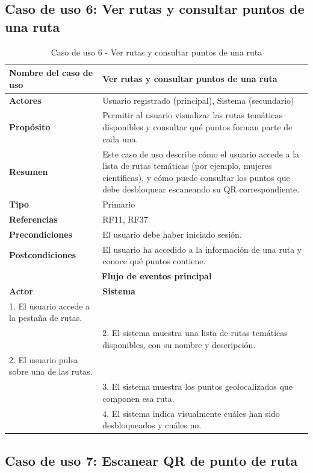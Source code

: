 \clearpage
\subsection{Caso de uso 6: Ver rutas y consultar puntos de una ruta}

\begin{table}[H]
\centering
\caption{Caso de uso 6 - Ver rutas y consultar puntos de una ruta}
\begin{tabular}{|p{4.5cm}|p{10.5cm}|}
\hline
\textbf{Nombre del caso de uso} & Ver rutas y consultar puntos de una ruta \\
\hline
\textbf{Actores} & Usuario registrado (principal), Sistema (secundario) \\
\hline
\textbf{Propósito} & Permitir al usuario visualizar las rutas temáticas disponibles y consultar qué puntos forman parte de cada una. \\
\hline
\textbf{Resumen} & Este caso de uso describe cómo el usuario accede a la lista de rutas temáticas (por ejemplo, mujeres científicas), y cómo puede consultar los puntos que debe desbloquear escaneando su QR correspondiente. \\
\hline
\textbf{Tipo} & Primario \\
\hline
\textbf{Referencias} & RF11, RF37 \\
\hline
\textbf{Precondiciones} & El usuario debe haber iniciado sesión. \\
\hline
\textbf{Postcondiciones} & El usuario ha accedido a la información de una ruta y conoce qué puntos contiene. \\
\hline
\multicolumn{2}{|c|}{\textbf{Flujo de eventos principal}} \\
\hline
\textbf{Actor} & \textbf{Sistema} \\
\hline
1. El usuario accede a la pestaña de rutas. & \\
\hline
& 2. El sistema muestra una lista de rutas temáticas disponibles, con su nombre y descripción. \\
\hline
2. El usuario pulsa sobre una de las rutas. & \\
\hline
& 3. El sistema muestra los puntos geolocalizados que componen esa ruta. \\
\hline
& 4. El sistema indica visualmente cuáles han sido desbloqueados y cuáles no. \\
\hline
\end{tabular}
\end{table}

\clearpage
\subsection{Caso de uso 7: Escanear QR de punto de ruta}

